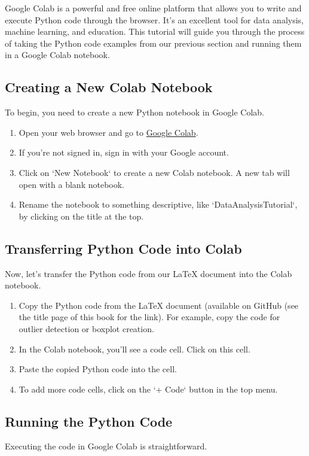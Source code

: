 \documentclass[a4paper,12pt]{book}
\newcounter{example}
\begin{document}
Google Colab is a powerful and free online platform that allows you to write and execute Python code through the browser. It's an excellent tool for data analysis, machine learning, and education. This tutorial will guide you through the process of taking the Python code examples from our previous section and running them in a Google Colab notebook.

\subsection{Creating a New Colab Notebook}
To begin, you need to create a new Python notebook in Google Colab.

\begin{enumerate}
    \item Open your web browser and go to \href{https://colab.research.google.com/}{Google Colab}.
    \item If you're not signed in, sign in with your Google account.
    \item Click on `New Notebook` to create a new Colab notebook. A new tab will open with a blank notebook.
    \item Rename the notebook to something descriptive, like `DataAnalysisTutorial`, by clicking on the title at the top.
\end{enumerate}

\subsection{Transferring Python Code into Colab}
Now, let's transfer the Python code from our LaTeX document into the Colab notebook.

\begin{enumerate}
    \item Copy the Python code from the LaTeX document (available on GitHub (see the title page of this book for the link). For example, copy the code for outlier detection or boxplot creation.
    \item In the Colab notebook, you'll see a code cell. Click on this cell.
    \item Paste the copied Python code into the cell.
    \item To add more code cells, click on the `+ Code` button in the top menu.
\end{enumerate}

\subsection{Running the Python Code}
Executing the code in Google Colab is straightforward.
\end{document}
